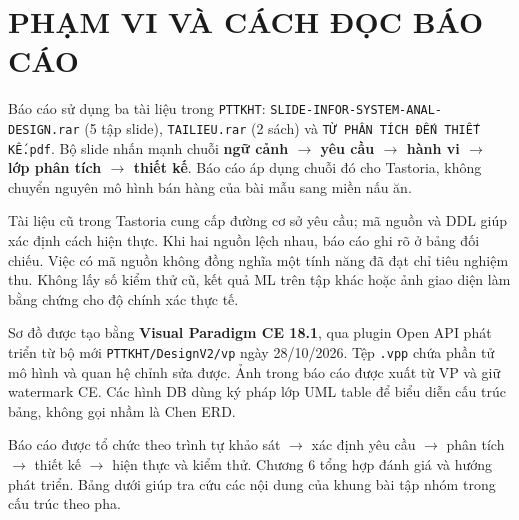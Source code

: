 \chapter*{PHẠM VI VÀ CÁCH ĐỌC BÁO CÁO}
Báo cáo sử dụng ba tài liệu trong {\small\texttt{PTTKHT}}: {\small\texttt{SLIDE-\allowbreak{}INFOR-\allowbreak{}SYSTEM-\allowbreak{}ANAL-\allowbreak{}DESIGN.\allowbreak{}rar}} (5 tập slide), {\small\texttt{TAILIEU.\allowbreak{}rar}} (2 sách) và {\small\texttt{TỪ PHÂN TÍCH ĐẾN THIẾT KẾ.\allowbreak{}pdf}}. Bộ slide nhấn mạnh chuỗi \textbf{ngữ cảnh \ensuremath{\rightarrow} yêu cầu \ensuremath{\rightarrow} hành vi \ensuremath{\rightarrow} lớp phân tích \ensuremath{\rightarrow} thiết kế}. Báo cáo áp dụng chuỗi đó cho Tastoria, không chuyển nguyên mô hình bán hàng của bài mẫu sang miền nấu ăn.

Tài liệu cũ trong Tastoria cung cấp đường cơ sở yêu cầu; mã nguồn và DDL giúp xác định cách hiện thực. Khi hai nguồn lệch nhau, báo cáo ghi rõ ở bảng đối chiếu. Việc có mã nguồn không đồng nghĩa một tính năng đã đạt chỉ tiêu nghiệm thu. Không lấy số kiểm thử cũ, kết quả ML trên tập khác hoặc ảnh giao diện làm bằng chứng cho độ chính xác thực tế.

Sơ đồ được tạo bằng \textbf{Visual Paradigm CE 18.1}, qua plugin Open API phát triển từ bộ mới {\small\texttt{PTTKHT/\allowbreak{}\allowbreak{}DesignV2/\allowbreak{}\allowbreak{}vp}} ngày 28/\allowbreak{}10/\allowbreak{}2026. Tệp {\small\texttt{.\allowbreak{}vpp}} chứa phần tử mô hình và quan hệ chỉnh sửa được. Ảnh trong báo cáo được xuất từ VP và giữ watermark CE. Các hình DB dùng ký pháp lớp UML \guillemotleft{}table\guillemotright{} để biểu diễn cấu trúc bảng, không gọi nhầm là Chen ERD.

Báo cáo được tổ chức theo trình tự khảo sát \ensuremath{\rightarrow} xác định yêu cầu \ensuremath{\rightarrow} phân tích \ensuremath{\rightarrow} thiết kế \ensuremath{\rightarrow} hiện thực và kiểm thử. Chương 6 tổng hợp đánh giá và hướng phát triển. Bảng dưới giúp tra cứu các nội dung của khung bài tập nhóm trong cấu trúc theo pha.


